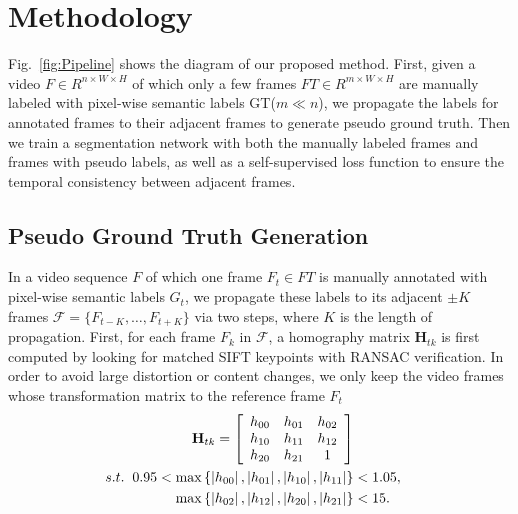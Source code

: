 \section{Methodology}
\label{sec:metho}
Fig.~\ref{fig:Pipeline} shows the diagram of our proposed method.
%
First, given a video $F\in R^{n\times W\times H}$ of which only a few frames $FT\in R^{m\times W\times H}$ are manually labeled with pixel-wise semantic labels GT(${m\ll n}$), we propagate the labels for annotated frames to their adjacent frames to generate pseudo ground truth.
%
Then we train a segmentation network with both the manually labeled frames and frames with pseudo labels, as well as a self-supervised loss function to ensure the temporal consistency between adjacent frames.

\subsection{Pseudo Ground Truth Generation}
%
In a video sequence $F$ of which one frame $F_t\in FT$ is manually annotated with pixel-wise semantic labels $G_t$, we propagate these labels to its adjacent $\pm K$ frames $\mathcal{F}=\{F_{t-K},\ldots, F_{t+K}\}$ via two steps, where $K$ is the length of propagation.
%
First, for each frame $F_k$ in $\mathcal{F}$, a homography matrix $\mathbf{H}_{tk}$ is first computed by looking for matched SIFT keypoints with RANSAC verification.
%
In order to avoid large distortion or content changes, we only keep the video frames whose transformation matrix to the reference frame $F_t$
% 
\begin{equation}
\centering
\begin{aligned}
\mathbf{H}_{tk}
=
\left[
\begin{array}{ccc}
h_{00} & h_{01} & h_{02}\\
h_{10} & h_{11} & h_{12}\\
h_{20} & h_{21} & 1\\
\end{array}
\right] \\
s.t. \hspace{0.2cm}0.95<\max{\left\{\left|h_{00}\right|,\left|h_{01}\right|,\left|h_{10}\right|,\left|h_{11}\right|\right\}}&<1.05,\\
\max{\left\{\left|h_{02}\right|,\left|h_{12}\right|,\left|h_{20}\right|,\left|h_{21}\right|\right\}}&<15.\\
\end{aligned}
\end{equation}


